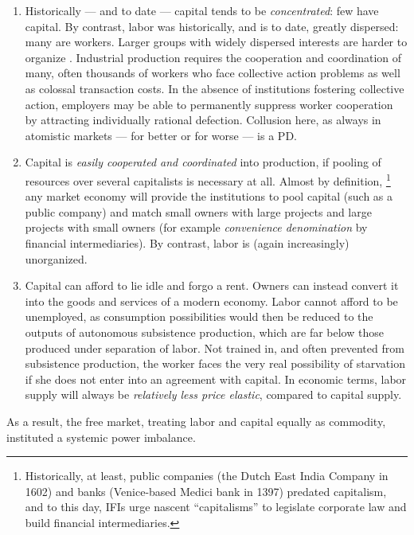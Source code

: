 \begin{enumerate}
	\item Historically --- and to date --- capital tends to be \emph{concentrated}:
few have capital.
By contrast, labor was historically, and is to date, greatly dispersed:
many are workers.
Larger groups with widely dispersed interests are harder to organize \citep{Olson-1971-aa}.
Industrial production requires the cooperation and coordination of many, often thousands of workers who face collective action problems as well as colossal transaction costs.
In the absence of institutions fostering collective action, employers may be able to permanently suppress worker cooperation by attracting individually rational defection.
Collusion here, as always in atomistic markets --- for better or for worse --- is a \gls{PD}.
	\item Capital is \emph{easily cooperated and coordinated} into production, if pooling of resources over several capitalists is necessary at all.
	Almost by definition,
	\footnote{
		Historically, at least, public companies (the Dutch East India Company in 1602) and banks (Venice-based Medici bank in 1397) predated capitalism, and to this day, \glspl{IFI} urge nascent ``capitalisms'' to legislate corporate law and build financial intermediaries.
	}
	any market economy will provide the institutions to pool capital (such as a public company) and match small owners with large projects and large projects with small owners (for example  \emph{convenience denomination} by financial intermediaries).
By contrast, labor is (again increasingly) unorganized.
	\item Capital can afford to lie idle and forgo a rent.
Owners can instead convert it into the goods and services of a modern economy.
Labor cannot afford to be unemployed, as consumption possibilities would then be reduced to the outputs of autonomous subsistence production, which are far below those produced under separation of labor.
Not trained in, and often prevented from subsistence production, the worker faces the very real possibility of starvation if she does not enter into an agreement with capital.
In economic terms, labor supply will always be \emph{relatively less price elastic}, compared to capital supply.
\end{enumerate}

As a result, the free market, treating labor and capital equally as commodity, instituted a systemic power imbalance.

